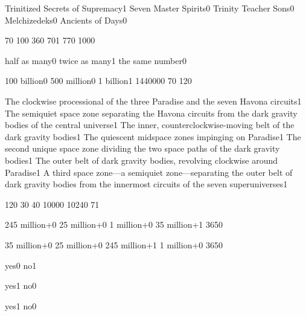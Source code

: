 {Trinitized Secrets of Supremacy}{1}
{Seven Master Spirits}{0}
{Trinity Teacher Sons}{0}
{Melchizedeks}{0}
{Ancients of Days}{0}
\qstop


{7}{0}
{10}{0}
{36}{0}
{70}{1}
{77}{0}
{100}{0}
\qstop

{half as many}{0}
{twice as many}{1}
{the same number}{0}
\qstop

{100 billion}{0}
{500 million}{0}
{1 billion}{1}
{144000}{0}
{7}{0}
{12}{0}
\qstop

{The clockwise processional of the three Paradise and the seven Havona circuits}{1}
{The semiquiet space zone separating the Havona circuits from the dark gravity bodies of the central universe}{1}
{The inner, counterclockwise-moving belt of the dark gravity bodies}{1}
{The quiescent midspace zones impinging on Paradise}{1}
{The second unique space zone dividing the two space paths of the dark gravity bodies}{1}
{The outer belt of dark gravity bodies, revolving clockwise around Paradise}{1}
{A third space zone—a semiquiet zone—separating the outer belt of dark gravity bodies from the innermost circuits of the seven superuniverses}{1}
\qstop

{12}{0}
{3}{0}
{4}{0}
{1000}{0}
{1024}{0}
{7}{1}
\qstop

{245 million+}{0}
{25 million+}{0}
{1 million+}{0}
{35 million+}{1}
{365}{0}
\qstop

{35 million+}{0}
{25 million+}{0}
{245 million+}{1}
{1 million+}{0}
{365}{0}
\qstop

{yes}{0}
{no}{1}
\qstop

{yes}{1}
{no}{0}
\qstop

{yes}{1}
{no}{0}
\qstop

